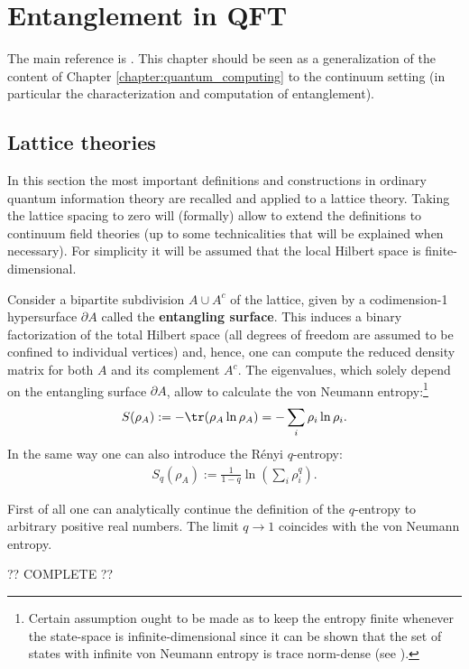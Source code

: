 \chapter{Entanglement in QFT}

    The main reference is \cite{entanglement_entropy, tuybens}. This chapter should be seen as a generalization of the content of Chapter \ref{chapter:quantum_computing} to the continuum setting (in particular the characterization and computation of entanglement).

\section{Lattice theories}

    In this section the most important definitions and constructions in ordinary quantum information theory are recalled and applied to a lattice theory. Taking the lattice spacing to zero will (formally) allow to extend the definitions to continuum field theories (up to some technicalities that will be explained when necessary). For simplicity it will be assumed that the local Hilbert space is finite-dimensional.

    Consider a bipartite subdivision $A\cup A^c$ of the lattice, given by a codimension-1 hypersurface $\partial A$ called the \textbf{entangling surface}. This induces a binary factorization of the total Hilbert space (all degrees of freedom are assumed to be confined to individual vertices) and, hence, one can compute the reduced density matrix for both $A$ and its complement $A^c$. The eigenvalues, which solely depend on the entangling surface $\partial A$, allow to calculate the von Neumann entropy:\footnote{Certain assumption ought to be made as to keep the entropy finite whenever the state-space is infinite-dimensional since it can be shown that the set of states with infinite von Neumann entropy is trace norm-dense (see \cite{Eisert_entropy}).}
    \begin{gather}
        S(\rho_A) := -\tr(\rho_A\ln\rho_A) = -\sum_i\rho_i\ln\rho_i.
    \end{gather}
    In the same way one can also introduce the R\'enyi $q$-entropy:
    \begin{gather}
        S_q(\rho_A) := \frac{1}{1-q}\ln\left(\sum_i\rho_i^q\right).
    \end{gather}
    \begin{property}
         First of all one can analytically continue the definition of the $q$-entropy to arbitrary positive real numbers. The limit $q\longrightarrow1$ coincides with the von Neumann entropy.
    \end{property}

    ?? COMPLETE ??
